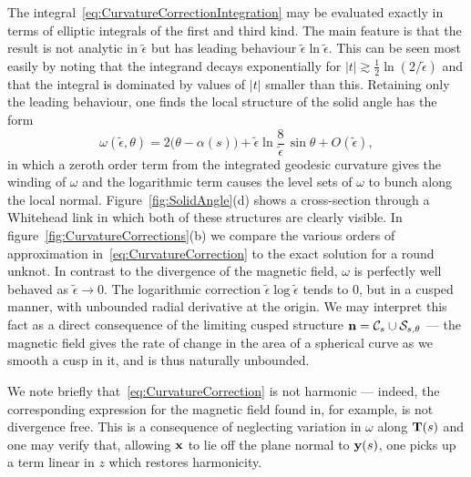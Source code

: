     The integral~\eqref{eq:CurvatureCorrectionIntegration} may be evaluated exactly in terms of elliptic integrals of the first and third kind. The main feature is that the result is not analytic in $\tilde{\epsilon}$ but has leading behaviour $\tilde{\epsilon} \ln \tilde{\epsilon}$. This can be seen most easily by noting that the integrand decays exponentially for $|t| \gtrsim \frac{1}{2} \ln (2/\tilde{\epsilon})$ and that the integral is dominated by values of $|t|$ smaller than this. 
    Retaining only the leading behaviour, one finds the local structure of the solid angle has the form 
    \begin{equation}
        \omega(\tilde{\epsilon}, \theta)= 2 \bigl( \theta-\alpha(s) \bigr) + \tilde{\epsilon} \ln \frac{8}{\tilde{\epsilon}}\, \sin \theta + O(\tilde{\epsilon}) ,
        \label{eq:CurvatureCorrection}
    \end{equation} 
    in which a zeroth order term from the integrated geodesic curvature gives the winding of $\omega$ and the logarithmic term causes the level sets of $\omega$ to bunch along the local normal. Figure~\ref{fig:SolidAngle}(d) shows a cross-section through a Whitehead link in which both of these structures are clearly visible. In figure~\ref{fig:CurvatureCorrections}(b) we compare the various orders of approximation in~\eqref{eq:CurvatureCorrection} to the exact solution for a round unknot. In contrast to the divergence of the magnetic field, $\omega$ is perfectly well behaved as $\tilde{\epsilon} \rightarrow 0$. The logarithmic correction $\tilde{\epsilon} \log \tilde{\epsilon}$ tends to $0$, but in a cusped manner, with unbounded radial derivative at the origin. We may interpret this fact as a direct consequence of the limiting cusped structure ${\bf n} = \mathcal{C}_s \cup \mathcal{S}_{s,\theta}$ --- the magnetic field gives the rate of change in the area of a spherical curve as we smooth a cusp in it, and is thus naturally unbounded. 

    We note briefly that~\eqref{eq:CurvatureCorrection} is not harmonic --- indeed, the corresponding expression for the magnetic field found in, for example, \citep{Saffman1992} is not divergence free. This is a consequence of neglecting variation in $\omega$ along ${\bf T} (s)$ and one may verify that, allowing $\bf {x}$ to lie off the plane normal to ${\bf y}(s)$, one picks up a term linear in $z$ which restores harmonicity. 

